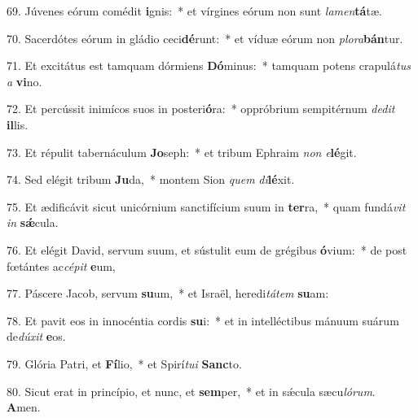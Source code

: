 69. Júvenes eórum comédit \textbf{i}gnis:~*  et vírgines eórum non sunt \textit{la}\textit{men}\textbf{tá}tæ.\

70. Sacerdótes eórum in gládio ceci\textbf{dé}runt:~*  et víduæ eórum non \textit{plo}\textit{ra}\textbf{bán}tur.\

71. Et excitátus est tamquam dórmiens \textbf{Dó}minus:~*  tamquam potens crapulá\textit{tus} \textit{a} \textbf{vi}no.\

72. Et percússit inimícos suos in posteri\textbf{ó}ra:~*  oppróbrium sempitérnum \textit{de}\textit{dit} \textbf{il}lis.\

73. Et répulit tabernáculum \textbf{Jo}seph:~*  et tribum Ephraim \textit{non} \textit{e}\textbf{lé}git.\

74. Sed elégit tribum \textbf{Ju}da,~*  montem Sion \textit{quem} \textit{di}\textbf{lé}xit.\

75. Et ædificávit sicut unicórnium sanctifícium suum in \textbf{ter}ra,~*  quam fundá\textit{vit} \textit{in} \textbf{sǽ}cula.\

76. Et elégit David, servum suum, et sústulit eum de grégibus \textbf{ó}vium:~*  de post fœtántes ac\textit{cé}\textit{pit} \textbf{e}um,\

77. Páscere Jacob, servum \textbf{su}um,~*  et Israël, heredi\textit{tá}\textit{tem} \textbf{su}am:\

78. Et pavit eos in innocéntia cordis \textbf{su}i:~*  et in intelléctibus mánuum suárum de\textit{dú}\textit{xit} \textbf{e}os.\

79. Glória Patri, et \textbf{Fí}lio,~*  et Spirí\textit{tu}\textit{i} \textbf{Sanc}to.\

80. Sicut erat in princípio, et nunc, et \textbf{sem}per,~*  et in sǽcula sæcu\textit{ló}\textit{rum}. \textbf{A}men.\

